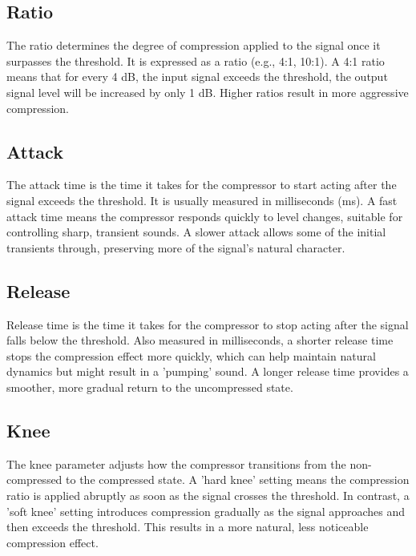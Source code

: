 \documentclass[10pt]{article}
\begin{document}
\begin{multicols*}{2}
            \subsection{Ratio}
                The ratio determines the degree of compression applied to the signal once it surpasses the threshold. It is expressed as a ratio (e.g., 4:1, 10:1). A 4:1 ratio means that for every 4 dB, the input signal exceeds the threshold, the output signal level will be increased by only 1 dB. Higher ratios result in more aggressive compression.

            \subsection{Attack}
                The attack time is the time it takes for the compressor to start acting after the signal exceeds the threshold. It is usually measured in milliseconds (ms). A fast attack time means the compressor responds quickly to level changes, suitable for controlling sharp, transient sounds. A slower attack allows some of the initial transients through, preserving more of the signal's natural character.

            \subsection{Release}
                Release time is the time it takes for the compressor to stop acting after the signal falls below the threshold. Also measured in milliseconds, a shorter release time stops the compression effect more quickly, which can help maintain natural dynamics but might result in a 'pumping' sound. A longer release time provides a smoother, more gradual return to the uncompressed state.
            
                \noindent
                \begin{minipage}{\linewidth}
                    \centering
                    
                    \label{fig:comp-trans}
                \end{minipage}

            \subsection{Knee}
                The knee parameter adjusts how the compressor transitions from the non-compressed to the compressed state. A 'hard knee' setting means the compression ratio is applied abruptly as soon as the signal crosses the threshold. In contrast, a 'soft knee' setting introduces compression gradually as the signal approaches and then exceeds the threshold. This results in a more natural, less noticeable compression effect.
            

\end{multicols*}
\end{document}
